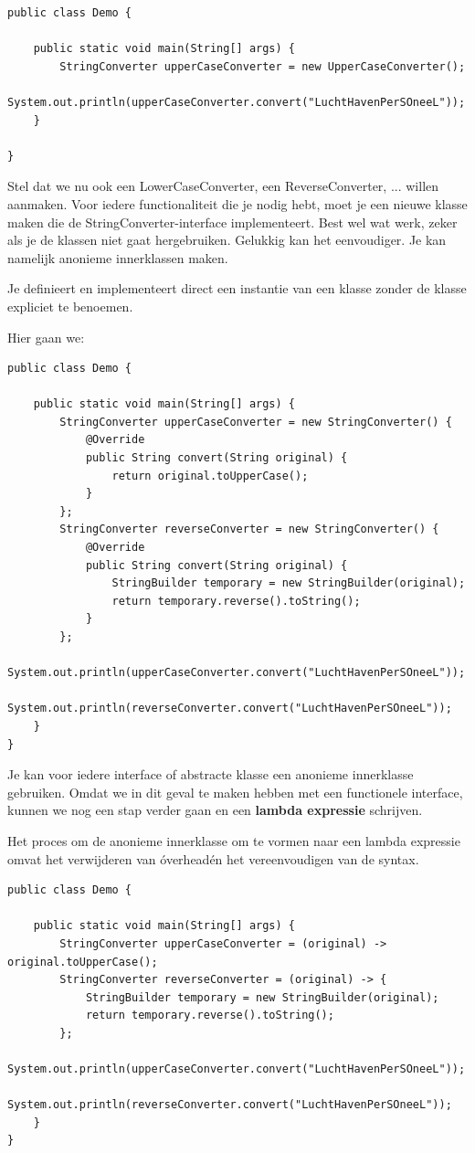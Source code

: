 \begin{lstlisting}
public class Demo {

	public static void main(String[] args) {
		StringConverter upperCaseConverter = new UpperCaseConverter();
		System.out.println(upperCaseConverter.convert("LuchtHavenPerSOneeL"));
	}

}
\end{lstlisting}

Stel dat we nu ook een LowerCaseConverter,  een ReverseConverter, ...  willen aanmaken. Voor iedere functionaliteit die je nodig hebt, moet je een nieuwe klasse maken die de StringConverter-interface implementeert. 
Best wel wat werk,  zeker als je de klassen niet gaat hergebruiken. 
Gelukkig kan het eenvoudiger. Je kan namelijk anonieme innerklassen maken.

Je definieert en implementeert direct een instantie van een klasse zonder de klasse expliciet te benoemen. 

Hier gaan we:

\begin{lstlisting}
public class Demo {

	public static void main(String[] args) {
		StringConverter upperCaseConverter = new StringConverter() {
			@Override
			public String convert(String original) {
				return original.toUpperCase();
			}
		};
		StringConverter reverseConverter = new StringConverter() {
			@Override
			public String convert(String original) {
				StringBuilder temporary = new StringBuilder(original);
				return temporary.reverse().toString();
			}
		};
		System.out.println(upperCaseConverter.convert("LuchtHavenPerSOneeL"));
		System.out.println(reverseConverter.convert("LuchtHavenPerSOneeL"));
	}
}
\end{lstlisting}

Je kan voor iedere interface of abstracte klasse een anonieme innerklasse gebruiken.
Omdat we in dit geval te maken hebben met een functionele interface, kunnen we nog een stap verder gaan en een \textbf{lambda expressie} schrijven.

 Het proces om de anonieme innerklasse om te vormen naar een lambda expressie omvat het verwijderen van \'overhead\' en het vereenvoudigen van de syntax. 

\begin{lstlisting}
public class Demo {

	public static void main(String[] args) {
		StringConverter upperCaseConverter = (original) -> original.toUpperCase();
		StringConverter reverseConverter = (original) -> {
			StringBuilder temporary = new StringBuilder(original);
			return temporary.reverse().toString();
		};
		System.out.println(upperCaseConverter.convert("LuchtHavenPerSOneeL"));
		System.out.println(reverseConverter.convert("LuchtHavenPerSOneeL"));
	}
}
\end{lstlisting}

